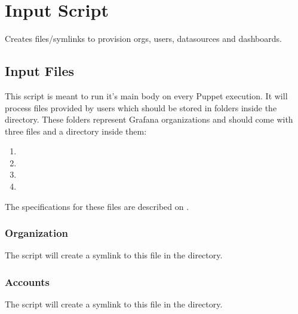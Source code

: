 \documentclass[letterpaper,10pt,english]{sphinxmanual}
\begin{document}
\chapter{Input Script}
\label{\detokenize{inputs:module-gpInputs}}\label{\detokenize{inputs:input-script}}\label{\detokenize{inputs::doc}}
Creates files/symlinks to provision orgs, users, datasources and dashboards.


\section{Input Files}
\label{\detokenize{inputs:input-files}}
This script is meant to run it’s main body on every Puppet execution. It will
process files provided by users which should be stored in folders inside the
 directory. These folders represent Grafana organizations and should
come with three files and a directory inside them:
\begin{enumerate}
\def\theenumi{\arabic{enumi}}
\def\labelenumi{\theenumi .}
\makeatletter\def\p@enumii{\p@enumi \theenumi .}\makeatother
\item {} 

\item {} 

\item {} 

\item {} 

\end{enumerate}

The specifications for these files are described on {\hyperref[\detokenize{inputStructure:input-structure}]{}}.


\subsection{Organization}
\label{\detokenize{inputs:organization}}
The script will create a symlink to this file in the  directory.


\subsection{Accounts}
\label{\detokenize{inputs:accounts}}
The script will create a symlink to this file in the  directory.
\end{document}
